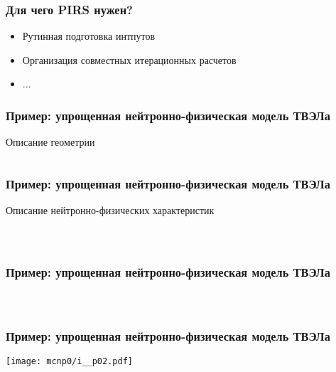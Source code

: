 \documentclass[t]{beamer}
\begin{document}
\begin{frame}\frametitle{Для чего PIRS  нужен?}    

    
    \begin{itemize}
    \item Рутинная подготовка интпутов 

    \item Организация совместных итерационных расчетов

    \item ...
    \end{itemize}

\end{frame}

\begin{frame}[fragile]
    \frametitle{Пример: упрощенная нейтронно-физическая модель ТВЭЛа}

    Описание геометрии
    \inputminted[frame=single,fontfamily=tt,fontsize=\footnotesize]{python}{geom.py}

\end{frame}

\begin{frame}[fragile]
    \frametitle{Пример: упрощенная нейтронно-физическая модель ТВЭЛа}

    Описание нейтронно-физических характеристик

    \begin{columns}
            \inputminted[frame=single,fontfamily=tt,fontsize=\footnotesize,firstline=3,lastline=17]{python}{mc_int.py}
            \inputminted[frame=single,fontfamily=tt,fontsize=\footnotesize,firstline=17]{python}{mc_int.py}
    \end{columns}

\end{frame}

\begin{frame}[fragile]
    \frametitle{Пример: упрощенная нейтронно-физическая модель ТВЭЛа}
    \begin{columns}
            \inputminted[frame=single,fontfamily=tt,fontsize=\tiny,firstline=3,lastline=30]{rst}{mcnp0/i_}
            \inputminted[frame=single,fontfamily=tt,fontsize=\tiny,firstline=31]{rst}{mcnp0/i_}
    \end{columns}
\end{frame}

\begin{frame}[fragile]
    \frametitle{Пример: упрощенная нейтронно-физическая модель ТВЭЛа}


            \texttt{[image: mcnp0/i\_\_p02.pdf]}
\end{frame}
\end{document}

